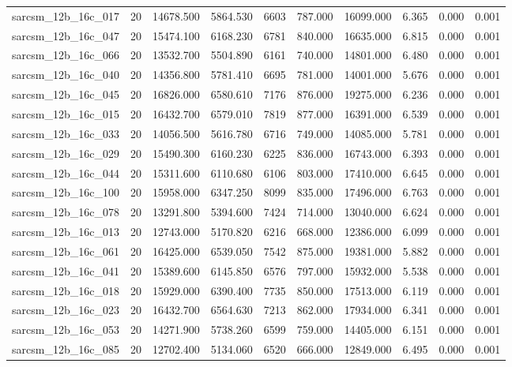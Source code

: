\begin{tabular}{lrrrrrrrrr}
sarcsm\_12b\_16c\_017 & 20 & 14678.500 & 5864.530 & 6603 & 787.000 & 16099.000 & 6.365 & 0.000 & 0.001 \\
sarcsm\_12b\_16c\_047 & 20 & 15474.100 & 6168.230 & 6781 & 840.000 & 16635.000 & 6.815 & 0.000 & 0.001 \\
sarcsm\_12b\_16c\_066 & 20 & 13532.700 & 5504.890 & 6161 & 740.000 & 14801.000 & 6.480 & 0.000 & 0.001 \\
sarcsm\_12b\_16c\_040 & 20 & 14356.800 & 5781.410 & 6695 & 781.000 & 14001.000 & 5.676 & 0.000 & 0.001 \\
sarcsm\_12b\_16c\_045 & 20 & 16826.000 & 6580.610 & 7176 & 876.000 & 19275.000 & 6.236 & 0.000 & 0.001 \\
sarcsm\_12b\_16c\_015 & 20 & 16432.700 & 6579.010 & 7819 & 877.000 & 16391.000 & 6.539 & 0.000 & 0.001 \\
sarcsm\_12b\_16c\_033 & 20 & 14056.500 & 5616.780 & 6716 & 749.000 & 14085.000 & 5.781 & 0.000 & 0.001 \\
sarcsm\_12b\_16c\_029 & 20 & 15490.300 & 6160.230 & 6225 & 836.000 & 16743.000 & 6.393 & 0.000 & 0.001 \\
sarcsm\_12b\_16c\_044 & 20 & 15311.600 & 6110.680 & 6106 & 803.000 & 17410.000 & 6.645 & 0.000 & 0.001 \\
sarcsm\_12b\_16c\_100 & 20 & 15958.000 & 6347.250 & 8099 & 835.000 & 17496.000 & 6.763 & 0.000 & 0.001 \\
sarcsm\_12b\_16c\_078 & 20 & 13291.800 & 5394.600 & 7424 & 714.000 & 13040.000 & 6.624 & 0.000 & 0.001 \\
sarcsm\_12b\_16c\_013 & 20 & 12743.000 & 5170.820 & 6216 & 668.000 & 12386.000 & 6.099 & 0.000 & 0.001 \\
sarcsm\_12b\_16c\_061 & 20 & 16425.000 & 6539.050 & 7542 & 875.000 & 19381.000 & 5.882 & 0.000 & 0.001 \\
sarcsm\_12b\_16c\_041 & 20 & 15389.600 & 6145.850 & 6576 & 797.000 & 15932.000 & 5.538 & 0.000 & 0.001 \\
sarcsm\_12b\_16c\_018 & 20 & 15929.000 & 6390.400 & 7735 & 850.000 & 17513.000 & 6.119 & 0.000 & 0.001 \\
sarcsm\_12b\_16c\_023 & 20 & 16432.700 & 6564.630 & 7213 & 862.000 & 17934.000 & 6.341 & 0.000 & 0.001 \\
sarcsm\_12b\_16c\_053 & 20 & 14271.900 & 5738.260 & 6599 & 759.000 & 14405.000 & 6.151 & 0.000 & 0.001 \\
sarcsm\_12b\_16c\_085 & 20 & 12702.400 & 5134.060 & 6520 & 666.000 & 12849.000 & 6.495 & 0.000 & 0.001 \\

\end{tabular}

